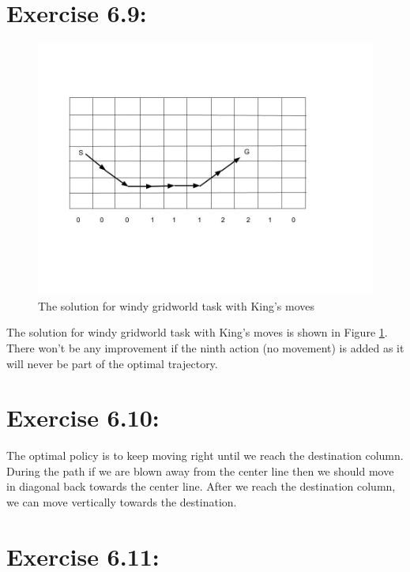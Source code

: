 \documentclass[10pt,letterpaper]{article}
\begin{document}
\section*{Exercise 6.9: }
\label{6.9}

\begin{figure}[htp]
\begin{center}
  \includegraphics[scale=0.3]{Kings_move_Windy_Gridworld}
\end{center}
  \caption{The solution for windy gridworld task with King's moves}
  \label{fig:king_move}
\end{figure}

The solution for windy gridworld task with King's moves is shown in Figure \ref{fig:king_move}. There won't be any improvement if the ninth action (no movement) is added as it will never be part of the optimal trajectory.


\section*{Exercise 6.10: }
\label{6.10}

The optimal policy is to keep moving right until we reach the destination column. During the path if we are blown away from the center line then we should move in diagonal back towards the center line. After we reach the destination column, we can move vertically towards the destination.


\section*{Exercise 6.11: }
\label{6.11}
\end{document}

